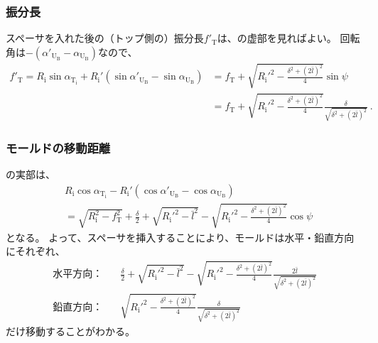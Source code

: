 \subsubsection{振分長}
スペーサを入れた後の（トップ側の）振分長$f'_\mathrm T$は、の虚部を見ればよい。
回転角は$-(\alpha'_{\mathrm U_\mathrm B}-\alpha_{\mathrm U_\mathrm B})$なので、
\begin{align*}
  f'_\mathrm T
  = R_\mathrm i\sin\alpha_{\mathrm T_\mathrm i}
    +R_\mathrm i'\left(\sin\alpha'_{\mathrm U_\mathrm B}-\sin\alpha_{\mathrm U_\mathrm B}\right)
  &= f_\mathrm T+\sqrt{R_\mathrm i'^2-\frac{\delta^2+(2\bar l)^2}4}\sin\psi\\
  &= f_\mathrm T+\sqrt{R_\mathrm i'^2-\frac{\delta^2+(2\bar l)^2}4}\frac\delta{\sqrt{\delta^2+(2\bar l)^2}}\ .
\end{align*}


\subsubsection{モールドの移動距離}
の実部は、
\begin{align*}
  & R_\mathrm i\cos\alpha_{\mathrm T_\mathrm i}
    -R_\mathrm i'(\cos\alpha'_{\mathrm U_\mathrm B}-\cos\alpha_{\mathrm U_\mathrm B})\\
  & = \sqrt{R_\mathrm i^2-f_\mathrm T^2}+\frac\delta2+\sqrt{R_\mathrm i'^2-\bar l^2}
      -\sqrt{R_\mathrm i'^2-\frac{\delta^2+(2\bar l)^2}4}\cos\psi
\end{align*}
となる。
よって、スペーサを挿入することにより、モールドは水平・鉛直方向にそれぞれ、
\begin{subequations}
\begin{alignat}{2}
  \label{eq:spacerMoveHdistance}
  \text{水平方向：}\quad
  & \frac\delta2+\sqrt{R_\mathrm i'^2-\bar l^2}-\sqrt{R_\mathrm i'^2-\frac{\delta^2+(2\bar l)^2}4}\frac{2\bar l}{\sqrt{\delta^2+(2\bar l)^2}}\\
  \text{鉛直方向：}\quad
  & \sqrt{R_\mathrm i'^2-\frac{\delta^2+(2\bar l)^2}4}\frac\delta{\sqrt{\delta^2+(2\bar l)^2}}
\end{alignat}
\end{subequations}
だけ移動することがわかる。



